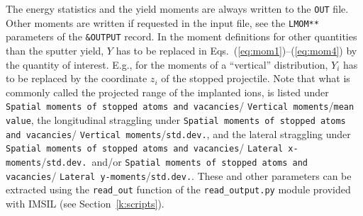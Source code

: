 The energy statistics and the yield moments are always written to the
\texttt{OUT} file. Other moments are written if requested in the input file,
see the \texttt{LMOM**} parameters of the \texttt{\&OUTPUT} record. In the
moment definitions for other quantities than the sputter yield, $Y$ has to be
replaced in Eqs.~(\ref{eq:mom1})--(\ref{eq:mom4}) by the quantity of interest.
E.g., for the moments of a ``vertical'' distribution, $Y_i$ has to be replaced
by the coordinate $z_i$ of the stopped projectile. Note that what is commonly
called the projected range of the implanted ions, is listed under 
\texttt{Spatial moments of stopped atoms and vacancies}/%
\texttt{Vertical moments}/\texttt{mean value}, the longitudinal straggling
under \texttt{Spatial moments of stopped atoms and vacancies}/%
\texttt{Vertical moments}/\texttt{std.dev.}, and the lateral straggling under 
\texttt{Spatial moments of stopped atoms and vacancies}/%
\texttt{Lateral x-moments}/\texttt{std.dev.\ }and/or
\texttt{Spatial moments of stopped atoms and vacancies}/%
\texttt{Lateral y-moments}/\texttt{std.dev.}. These and other parameters can be
extracted using the \texttt{read\_out} function of the \texttt{read\_output.py}
module provided with IMSIL (see Section~\ref{k:scripts}).
